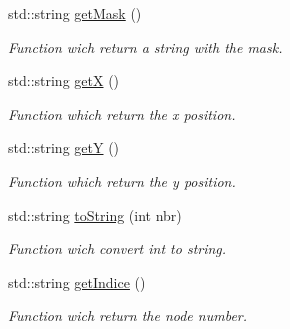 \begin{CompactItemize}
std::string \hyperlink{class_equipement_fd9a9ce18e78c3540a0cb6d633def3d3}{getMask} ()
\begin{CompactList}\small\item\em Function wich return a string with the mask. \item\end{CompactList}\item 
std::string \hyperlink{class_equipement_a5f9ea9a69609f65b8c64cda70446b02}{getX} ()
\begin{CompactList}\small\item\em Function which return the x position. \item\end{CompactList}\item 
std::string \hyperlink{class_equipement_a3b627e52bd5bfddadd665ffbf88cbd4}{getY} ()
\begin{CompactList}\small\item\em Function which return the y position. \item\end{CompactList}\item 
std::string \hyperlink{class_equipement_e6b65817f2f2d1f93669475530d849ca}{toString} (int nbr)
\begin{CompactList}\small\item\em Function wich convert int to string. \item\end{CompactList}\item 
std::string \hyperlink{class_equipement_6074ba51d63aaeebe8293a9ba9fde31f}{getIndice} ()
\begin{CompactList}\small\item\em Function wich return the node number. \item\end{CompactList}\end{CompactItemize}
